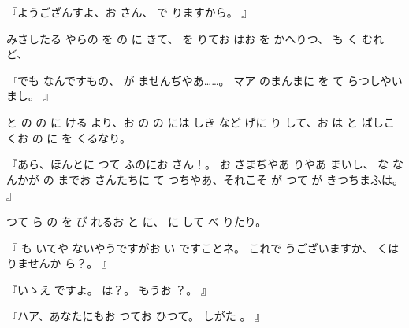 
『ようござんすよ、お
さん、
で
りますから。
』

みさしたる
やらの
を
の
に
きて、
を
りてお
はお
を
かへりつ、
も
く
むれど、

『でも
なんですもの、
が
ませんぢやあ……。
マア
のまんまに
を
て
らつしやいまし。
』

と
の
の
に
ける
より、お
の
の
には
しき
など
げに
り
して、お
は
と
ばしこくお
の
に
を
くるなり。

『あら、ほんとに
つて
ふのにお
さん！。
お
さまぢやあ
りやあ
まいし、
な
なんかが
の
までお
さんたちに
て
つちやあ、それこそ
が
つて
が
きつちまふは。
』

つて
ら
の
を
び
れるお
と
に、
に
して
べ
りたり。

『
も
いてや
ないやうですがお
い
ですことネ。
これで
うございますか、
くは
りませんか
ら？。
』

『いゝえ
ですよ。
は？。
もうお
？。
』

『ハア、あなたにもお
つてお
ひつて。
しがた
。
』


